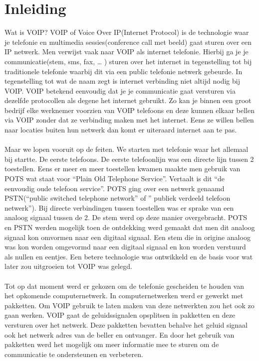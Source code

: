 \documentclass[pdftex,a4paper,12pt,twoside]{report}
\begin{document}
\chapter{Inleiding}
\label{ch:inleiding}

Wat is VOIP? VOIP of Voice Over IP(Internet Protocol) is de technologie waar je telefonie en multimedia sessies(conference call met beeld) gaat sturen over een IP netwerk. Men verwijst vaak naar VOIP als internet telefonie. Hierbij ga je je communicatie(stem, sms, fax, … ) sturen over het internet in tegenstelling tot bij traditionele telefonie waarbij dit via een public telefonie netwerk gebeurde. In tegenstelling tot wat de naam zegt is internet verbinding niet altijd nodig bij VOIP. VOIP betekend eenvoudig dat je je communicatie gaat versturen via dezelfde protocollen als degene het internet gebruikt. Zo kan je binnen een groot bedrijf elke werknemer voorzien van VOIP telefoons en deze kunnen elkaar bellen via VOIP zonder dat ze verbinding maken met het internet. Eens ze willen bellen naar locaties buiten hun netwerk dan komt er uiteraard internet aan te pas.\\ \\
Maar we lopen vooruit op de feiten. We starten met telefonie waar het allemaal bij startte. De eerste telefoons. De eerste telefoonlijn was een directe lijn tussen 2 toestellen. Eens er meer en meer toestellen kwamen maakte men gebruik van POTS wat staat voor “Plain Old Telephone Service”. Vertaalt is dit “de eenvoudig oude telefoon service”. POTS ging over een netwerk genaamd PSTN(“public switched telephone network” of ” publiek verdeeld telefoon netwerk”). Bij directe verbindingen tussen toestellen was er sprake van een analoog signaal tussen de 2. De stem werd op deze manier overgebracht. POTS en PSTN werden mogelijk toen de ontdekking werd gemaakt dat men dit analoog signaal kon omvormen naar een digitaal signaal. Een stem die in origine analoog was kon worden omgevormd naar een digitaal signaal en kon worden verstuurd als nullen en eentjes. Een betere technologie was ontwikkeld en de basis voor wat later zou uitgroeien tot VOIP was gelegd. \\ \\
Tot op dat moment werd er gekozen om de telefonie gescheiden te houden van het opkomende computernetwerk. In computernetwerken werd er gewerkt met pakketten. Om VOIP gebruik te laten maken van deze netwerkten zou het ook zo gaan werken. VOIP gaat de geluidssignalen opsplitsen in pakketten en deze versturen over het netwerk. Deze pakketten bevatten behalve het geluid signaal ook het netwerk adres van de beller en ontvanger. En door het gebruik van pakketten werd het mogelijk om meer informatie mee te sturen om de communicatie te ondersteunen en verbeteren. \\ \\
\end{document}
